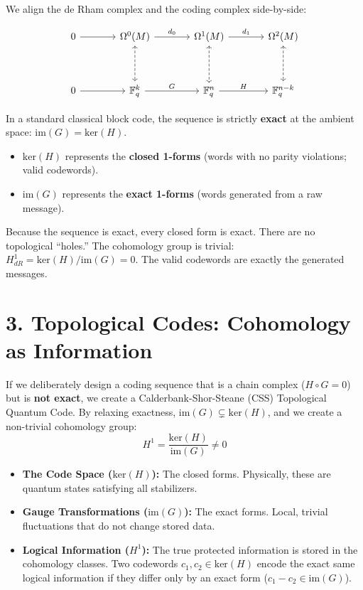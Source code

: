 \documentclass[11pt, a4paper, twoside]{article}
\newcommand{\F}{\mathbb{F}}
\newcommand{\im}{\text{im}}
\newcommand{\kerop}{\text{ker}}
\begin{document}
	We align the de Rham complex and the coding complex side-by-side:
	
	\[
	\begin{tikzcd}[row sep=huge, column sep=large]
		0 \arrow[r] & 
		\Omega^0(M) \arrow[r, "d_0"] \arrow[d,leftrightarrow, dashed] & 
		\Omega^1(M) \arrow[r, "d_1"] \arrow[d,leftrightarrow, dashed] & 
		\Omega^2(M) \arrow[d,leftrightarrow, dashed] \\
		0 \arrow[r] & 
		\F_q^k \arrow[r, "G"] & 
		\F_q^n \arrow[r, "H"] & 
		\F_q^{n-k} 
	\end{tikzcd}
	\]
	
	\begin{theorybox}
		In a standard classical block code, the sequence is strictly \textbf{exact} at the ambient space: $\im(G) = \kerop(H)$. 
		\begin{itemize}
			\item $\kerop(H)$ represents the \textbf{closed 1-forms} (words with no parity violations; valid codewords).
			\item $\im(G)$ represents the \textbf{exact 1-forms} (words generated from a raw message).
		\end{itemize}
		Because the sequence is exact, every closed form is exact. There are no topological ``holes.'' The cohomology group is trivial: $H^1_{dR} = \kerop(H) / \im(G) = 0$. The valid codewords are exactly the generated messages.
	\end{theorybox}
	
	\section*{3. Topological Codes: Cohomology as Information}
	
	If we deliberately design a coding sequence that is a chain complex ($H \circ G = 0$) but is \textbf{not exact}, we create a Calderbank-Shor-Steane (CSS) Topological Quantum Code. By relaxing exactness, $\im(G) \subsetneq \kerop(H)$, and we create a non-trivial cohomology group:
	$$ H^1 = \frac{\kerop(H)}{\im(G)} \neq 0 $$
	
	\begin{itemize}
		\item \textbf{The Code Space ($\kerop(H)$):} The closed forms. Physically, these are quantum states satisfying all stabilizers.
		\item \textbf{Gauge Transformations ($\im(G)$):} The exact forms. Local, trivial fluctuations that do not change stored data.
		\item \textbf{Logical Information ($H^1$):} The true protected information is stored in the cohomology classes. Two codewords $c_1, c_2 \in \kerop(H)$ encode the exact same logical information if they differ only by an exact form ($c_1 - c_2 \in \im(G)$).
	\end{itemize}
	
\end{document}

